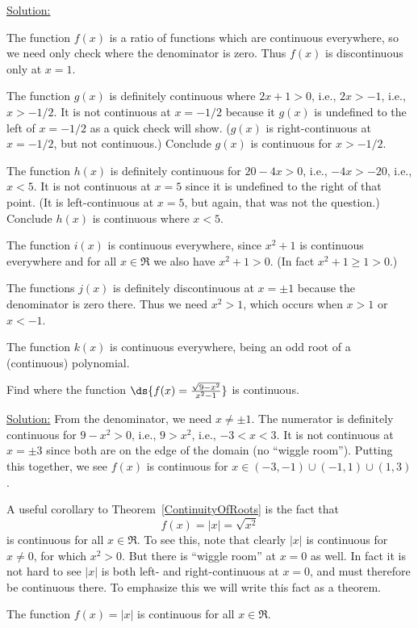 \underline{Solution:}

The function $f(x)$ is a ratio of functions which are continuous
everywhere, so we need only check where the denominator is zero.
Thus $f(x)$ is discontinuous only at $x=1$.

The function $g(x)$ is definitely continuous where $2x+1>0$, i.e., $2x>-1$,
i.e., $x>-1/2$.  It is not continuous at $x=-1/2$ because
it $g(x)$ is undefined to the left of $x=-1/2$ as a quick check
will show.  ($g(x)$ is right-continuous at $x=-1/2$, but not
continuous.) Conclude $g(x)$ is continuous for $x>-1/2$.

The function $h(x)$ is definitely  continuous for $20-4x>0$,
i.e., $-4x>-20$, i.e., $x<5$.  It is not continuous at $x=5$
since it is undefined to the right of that point. (It 
is left-continuous at $x=5$, but again, that was not the
question.) Conclude $h(x)$ is continuous where $x<5$.

The function $i(x)$ is continuous everywhere, since
$x^2+1$ is continuous everywhere and for all $x\in\Re$
we also have $x^2+1>0$. (In fact $x^2+1\ge1>0$.)


The functions $j(x)$ is definitely discontinuous at $x=\pm 1$ because
the denominator is zero there.  Thus we need $x^2>1$, which
occurs when $x>1$ or $x<-1$.

The function $k(x)$ is continuous everywhere, being an odd
root of a (continuous) polynomial.

\eex

\bex Find where the function $\ds{f(x)=\frac{\sqrt{9-x^2}}{x^2-1}}$
is continuous.

\underline{Solution:} From the denominator, we need $x\ne\pm1$.
The numerator is definitely continuous for $9-x^2>0$, i.e.,
$9>x^2$, i.e., $-3<x<3$.  It is not continuous at $x=\pm3$
since both are on the edge of the domain (no ``wiggle room'').
Putting this together, we see $f(x)$ is continuous
for $x\in(-3,-1)\cup(-1,1)\cup(1,3)$.
\eex



A useful corollary to Theorem~\ref{ContinuityOfRoots} is the fact
that 
$$f(x)=|x|=\sqrt{x^2}$$
is continuous for all $x\in\Re$.  To see this, note that 
clearly $|x|$ is continuous for $x\ne 0$, for which $x^2>0$.
But there is ``wiggle room'' at $x=0$ as well.  
In fact it is not hard to see $|x|$ is both left- and right-continuous
at $x=0$, and must therefore be continuous there.
To emphasize this we will write this fact as a theorem.
\begin{theorem}
The function $f(x)=|x|$ is continuous for all $x\in\Re$.
\label{|x|IsContinuousEverywhere}\end{theorem}

